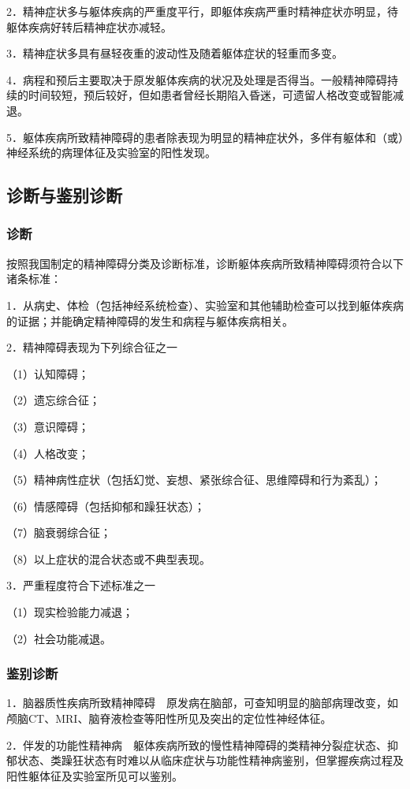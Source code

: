 2．精神症状多与躯体疾病的严重度平行，即躯体疾病严重时精神症状亦明显，待躯体疾病好转后精神症状亦减轻。

3．精神症状多具有昼轻夜重的波动性及随着躯体症状的轻重而多变。

4．病程和预后主要取决于原发躯体疾病的状况及处理是否得当。一般精神障碍持续的时间较短，预后较好，但如患者曾经长期陷入昏迷，可遗留人格改变或智能减退。

5．躯体疾病所致精神障碍的患者除表现为明显的精神症状外，多伴有躯体和（或）神经系统的病理体征及实验室的阳性发现。

\subsection{诊断与鉴别诊断}

\subsubsection{诊断}

按照我国制定的精神障碍分类及诊断标准，诊断躯体疾病所致精神障碍须符合以下诸条标准：

1．从病史、体检（包括神经系统检查）、实验室和其他辅助检查可以找到躯体疾病的证据；并能确定精神障碍的发生和病程与躯体疾病相关。

2．精神障碍表现为下列综合征之一

（1）认知障碍；

（2）遗忘综合征；

（3）意识障碍；

（4）人格改变；

（5）精神病性症状（包括幻觉、妄想、紧张综合征、思维障碍和行为紊乱）；

（6）情感障碍（包括抑郁和躁狂状态）；

（7）脑衰弱综合征；

（8）以上症状的混合状态或不典型表现。

3．严重程度符合下述标准之一

（1）现实检验能力减退；

（2）社会功能减退。

\subsubsection{鉴别诊断}

1．脑器质性疾病所致精神障碍　原发病在脑部，可查知明显的脑部病理改变，如颅脑CT、MRI、脑脊液检查等阳性所见及突出的定位性神经体征。

2．伴发的功能性精神病　躯体疾病所致的慢性精神障碍的类精神分裂症状态、抑郁状态、类躁狂状态有时难以从临床症状与功能性精神病鉴别，但掌握疾病过程及阳性躯体征及实验室所见可以鉴别。

